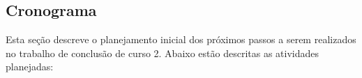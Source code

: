 \begin{comment}

\subsection{Portal do Software Público}

Criado em 12 de abril de 2007, o portal do SPB já conta com mais de 60 soluções voltadas para diversos setores. Para a SLTI (Secretaria de Logística e Tecnologia da Informação), o portal já se consolidou como um ambiente de compartilhamento de softwares. Isso resulta em uma gestão de recursos e gastos de informática mais racionalizada, ampliação de parcerias e reforço da política de software livre no setor público~\footnote{\url{softwarepublico.gov.br}}. 

As tecnologias de informação e comunicação estão se consolidando como meios de expressão do conhecimento, de expressão cultural e de transações econômicas. Na sociedade em rede, baseada em comunicação feita através de computadores, não é possível aceitar que as linguagens usadas nessa comunicação fiquem sob o poder de apenas alguns gigantes. No desenvolvimento de software que apresenta código aberto, como o SPB, as inovações são compartilhadas entre todos, permitindo que as melhorias sejam adotadas por qualquer um, assim o conhecimento passa a ser sempre disseminado, ajudando principalmente as pequenas e médias empresas

A evolução do software público ja passou por três etapas de desenvolvimento e está na sua quarta etapa, contando com seus usuários para desenvolver novas funcionalidades e melhorias, a partir de sugestões dadas pelos mesmos.

o portal foi desenvolvido baseado na plataforma Noosfero, e a partir disso planejamos aplicar no Portal os estudos que foram desenvolvidos neste trabalho, a avaliação de usabilidade a partir do desenvolvimento baseado em testes automatizados, a fim de responder se o processo de desenvolvimento utilizando práticas do BDD e TDD apresentam melhores resultados em testes de usabilidade.

\end{comment}

\subsection{Cronograma}

Esta seção descreve o planejamento inicial dos próximos passos a serem realizados no trabalho de conclusão de curso 2. Abaixo estão descritas as atividades planejadas:

